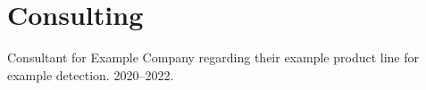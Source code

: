 
\section{\sc Consulting}

Consultant for Example Company regarding their example product line for example detection. 2020--2022.
